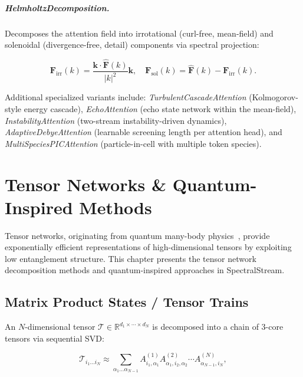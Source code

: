 \documentclass[11pt,a4paper,openright]{book}
\begin{document}
\paragraph{HelmholtzDecomposition.}
Decomposes the attention field into irrotational (curl-free, mean-field) and solenoidal (divergence-free, detail) components via spectral projection:

\begin{equation}
	\label{eq:helmholtz}
	\mathbf{F}_\text{irr}(k) = \frac{\mathbf{k} \cdot \hat{\mathbf{F}}(k)}{|k|^2} \mathbf{k}, \quad
	\mathbf{F}_\text{sol}(k) = \hat{\mathbf{F}}(k) - \mathbf{F}_\text{irr}(k).
\end{equation}

Additional specialized variants include: \emph{TurbulentCascadeAttention} (Kolmogorov-style energy cascade), \emph{EchoAttention} (echo state network within the mean-field), \emph{InstabilityAttention} (two-stream instability-driven dynamics), \emph{AdaptiveDebyeAttention} (learnable screening length per attention head), and \emph{MultiSpeciesPICAttention} (particle-in-cell with multiple token species).

\chapter{Tensor Networks \& Quantum-Inspired Methods}
\label{ch:tensornet}

Tensor networks, originating from quantum many-body physics~\cite{orús2014practical}, provide exponentially efficient representations of high-dimensional tensors by exploiting low entanglement structure. This chapter presents the tensor network decomposition methods and quantum-inspired approaches in SpectralStream.

\section{Matrix Product States / Tensor Trains}

An $N$-dimensional tensor $\mathcal{T} \in \mathbb{R}^{d_1 \times \cdots \times d_N}$ is decomposed into a chain of 3-core tensors via sequential SVD:

\begin{equation}
	\label{eq:mps}
	\mathcal{T}_{i_1\ldots i_N} \approx \sum_{\alpha_1\ldots\alpha_{N-1}}
	A^{(1)}_{i_1,\alpha_1}
	A^{(2)}_{\alpha_1,i_2,\alpha_2}
	\cdots
	A^{(N)}_{\alpha_{N-1},i_N},
\end{equation}
\end{document}
